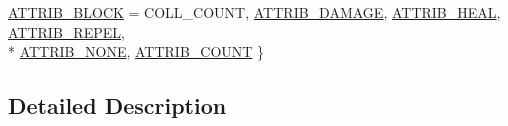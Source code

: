 \begin{DoxyCompactItemize}
\hyperlink{group___enums_ggaba562c78ac07e109b671de8a896e82fda50f42c169894d6a3341500219affbca2}{A\-T\-T\-R\-I\-B\-\_\-\-B\-L\-O\-C\-K} = C\-O\-L\-L\-\_\-\-C\-O\-U\-N\-T, 
\hyperlink{group___enums_ggaba562c78ac07e109b671de8a896e82fda83a3c19880b77745d3bd3013397622bc}{A\-T\-T\-R\-I\-B\-\_\-\-D\-A\-M\-A\-G\-E}, 
\hyperlink{group___enums_ggaba562c78ac07e109b671de8a896e82fda5cf4520ba60d852dc36d44738c2f9c11}{A\-T\-T\-R\-I\-B\-\_\-\-H\-E\-A\-L}, 
\hyperlink{group___enums_ggaba562c78ac07e109b671de8a896e82fda955c5d702dd868cded4572e623bdd48c}{A\-T\-T\-R\-I\-B\-\_\-\-R\-E\-P\-E\-L}, 
\\*
\hyperlink{group___enums_ggaba562c78ac07e109b671de8a896e82fda997be7d55f73f1a3ee75e08496cb9061}{A\-T\-T\-R\-I\-B\-\_\-\-N\-O\-N\-E}, 
\hyperlink{group___enums_ggaba562c78ac07e109b671de8a896e82fda6515b67921319ff2f68f6cc2919c2433}{A\-T\-T\-R\-I\-B\-\_\-\-C\-O\-U\-N\-T}
 \}
\end{DoxyCompactItemize}


\subsection{Detailed Description}


